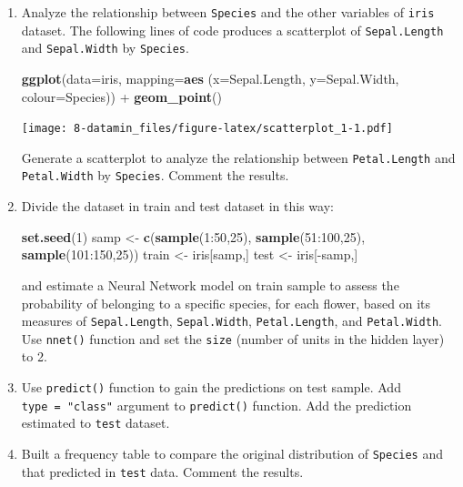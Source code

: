 \documentclass[]{book}
\newenvironment{Shaded}{\begin{snugshade}}{\end{snugshade}}
\newcommand{\KeywordTok}[1]{\textcolor[rgb]{0.13,0.29,0.53}{\textbf{{#1}}}}
\newcommand{\DataTypeTok}[1]{\textcolor[rgb]{0.13,0.29,0.53}{{#1}}}
\newcommand{\DecValTok}[1]{\textcolor[rgb]{0.00,0.00,0.81}{{#1}}}
\newcommand{\StringTok}[1]{\textcolor[rgb]{0.31,0.60,0.02}{{#1}}}
\newcommand{\NormalTok}[1]{{#1}}
\begin{document}
\begin{enumerate}
\def\labelenumi{\alph{enumi}.}
\item
  Analyze the relationship between \texttt{Species} and the other
  variables of \texttt{iris} dataset. The following lines of code
  produces a scatterplot of \texttt{Sepal.Length} and
  \texttt{Sepal.Width} by \texttt{Species}.

\begin{Shaded}
\begin{Highlighting}[]
\KeywordTok{ggplot}\NormalTok{(}\DataTypeTok{data=}\NormalTok{iris, }\DataTypeTok{mapping=}\KeywordTok{aes} \NormalTok{(}\DataTypeTok{x=}\NormalTok{Sepal.Length, }\DataTypeTok{y=}\NormalTok{Sepal.Width, }\DataTypeTok{colour=}\NormalTok{Species)) +}
\StringTok{  }\KeywordTok{geom_point}\NormalTok{()}
\end{Highlighting}
\end{Shaded}

  \texttt{[image: 8-datamin\_files/figure-latex/scatterplot\_1-1.pdf]}

  Generate a scatterplot to analyze the relationship between
  \texttt{Petal.Length} and \texttt{Petal.Width} by \texttt{Species}.
  Comment the results.
\item
  Divide the dataset in train and test dataset in this way:

\begin{Shaded}
\begin{Highlighting}[]
\KeywordTok{set.seed}\NormalTok{(}\DecValTok{1}\NormalTok{)}
\NormalTok{samp <-}\StringTok{ }\KeywordTok{c}\NormalTok{(}\KeywordTok{sample}\NormalTok{(}\DecValTok{1}\NormalTok{:}\DecValTok{50}\NormalTok{,}\DecValTok{25}\NormalTok{), }\KeywordTok{sample}\NormalTok{(}\DecValTok{51}\NormalTok{:}\DecValTok{100}\NormalTok{,}\DecValTok{25}\NormalTok{), }\KeywordTok{sample}\NormalTok{(}\DecValTok{101}\NormalTok{:}\DecValTok{150}\NormalTok{,}\DecValTok{25}\NormalTok{))}
\NormalTok{train <-}\StringTok{ }\NormalTok{iris[samp,] }
\NormalTok{test <-}\StringTok{ }\NormalTok{iris[-samp,]  }
\end{Highlighting}
\end{Shaded}

  and estimate a Neural Network model on train sample to assess the
  probability of belonging to a specific species, for each flower, based
  on its measures of \texttt{Sepal.Length}, \texttt{Sepal.Width},
  \texttt{Petal.Length}, and \texttt{Petal.Width}. Use \texttt{nnet()}
  function and set the \texttt{size} (number of units in the hidden
  layer) to 2.
\item
  Use \texttt{predict()} function to gain the predictions on test
  sample. Add \texttt{type\ =\ "class"} argument to \texttt{predict()}
  function. Add the prediction estimated to \texttt{test} dataset.
\item
  Built a frequency table to compare the original distribution of
  \texttt{Species} and that predicted in \texttt{test} data. Comment the
  results.
\end{enumerate}
\end{document}
